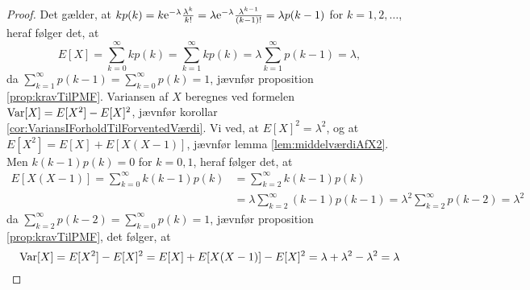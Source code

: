 \begin{proof}
Det gælder, at $kp(k) = k \mathrm{e}^{-\lambda} \frac{\lambda^k}{k!} = \lambda \mathrm{e}^{-\lambda} \frac{\lambda^{k - 1}}{(k - 1)!} = \lambda p(k - 1)$ for $k = 1, 2, \ldots$, heraf følger det, at 
\begin{equation*}
    E[X] = \sum^\infty_{k = 0} k p(k) = \sum^\infty_{k = 1} k p(k) = \lambda \sum^\infty_{k = 1} p(k - 1) = \lambda,
\end{equation*}
da $\sum^\infty_{k = 1} p(k - 1) = \sum^\infty_{k = 0} p(k) =  1$, jævnfør proposition \ref{prop:kravTilPMF}.
Variansen af $X$ beregnes ved formelen $\textnormal{Var}[X] = E[X^2] - E[X]^2$, jævnfør korollar \ref{cor:VariansIForholdTilForventedVærdi}. Vi ved, at $E[X]^2 = \lambda^2$, og at $E[X^2] = E[X] + E[X(X - 1)]$, jævnfør lemma \ref{lem:middelværdiAfX2}. Men $k(k - 1)p(k) = 0$ for $k = 0, 1$, heraf følger det, at
\begin{align*}
    E[X(X-1)] = \sum^{\infty}_{k = 0} k (k - 1) p(k)
    &= \sum^\infty_{k = 2} k(k - 1) p(k) \\ &=  \lambda\sum^\infty_{k = 2} (k - 1) p(k - 1) =\lambda^2 \sum^\infty_{k = 2} p(k - 2) = \lambda^2
\end{align*}
da $\sum^\infty_{k = 2} p(k - 2) = \sum^\infty_{k = 0} p(k) = 1$, jævnfør proposition \ref{prop:kravTilPMF}, det følger, at 
\begin{equation*}
    \textnormal{Var}[X] = E[X^2] - E[X]^2 = E[X] + E[X(X - 1)] - E[X]^2 = \lambda + \lambda^2 - \lambda^2 = \lambda
\end{equation*}
\end{proof}
